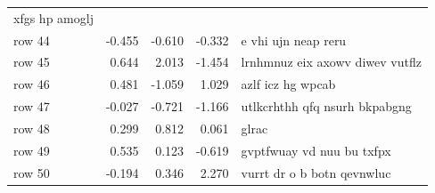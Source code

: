 \documentclass[twoside]{extreport}
\begin{document}
\begin{longtable}[]{@{}lrrrl@{}}
xfgs hp amoglj \\
row 44 & -0.455 & -0.610 & -0.332 & e vhi ujn neap reru \\
row 45 & 0.644 & 2.013 & -1.454 & lrnhmnuz eix axowv diwev vutflz \\
row 46 & 0.481 & -1.059 & 1.029 & azlf icz hg wpcab \\
row 47 & -0.027 & -0.721 & -1.166 & utlkcrhthh qfq nsurh bkpabgng \\
row 48 & 0.299 & 0.812 & 0.061 & glrac \\
row 49 & 0.535 & 0.123 & -0.619 & gvptfwuay vd nuu bu txfpx \\
row 50 & -0.194 & 0.346 & 2.270 & vurrt dr o b botn qevnwluc \\
\bottomrule
\end{longtable}

\chapter*{\bibname}
\hypertarget{refs}{}
\end{document}
